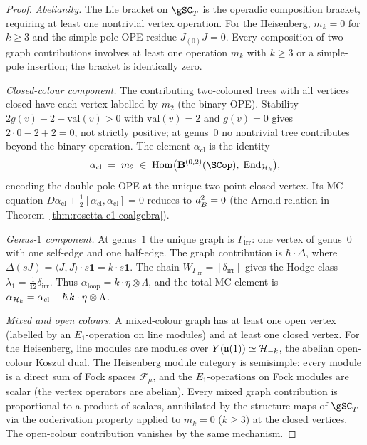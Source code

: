 \begin{proof}
\emph{Abelianity.}\enspace
The Lie bracket on $\gSC_T$ is the operadic composition bracket, requiring at least one nontrivial vertex operation. For the Heisenberg, $m_k = 0$ for $k \ge 3$ and the simple-pole OPE residue $J_{(0)}J = 0$. Every composition of two graph contributions involves at least one operation $m_k$ with $k \ge 3$ or a simple-pole insertion; the bracket is identically zero.

\emph{Closed-colour component.}\enspace
The contributing two-coloured trees with all vertices closed have each vertex labelled by $m_2$ (the binary OPE). Stability $2g(v) - 2 + \mathrm{val}(v) > 0$ with $\mathrm{val}(v) = 2$ and $g(v) = 0$ gives $2 \cdot 0 - 2 + 2 = 0$, not strictly positive; at genus~$0$ no nontrivial tree contributes beyond the binary operation. The element $\alpha_{\mathrm{cl}}$ is the identity
\[
\alpha_{\mathrm{cl}}
\;=\;
m_2 \;\in\;
\Hom\bigl(\mathbf{B}^{(0,2)}(\SCop),\;
\End_{\cH_k}\bigr),
\]
encoding the double-pole OPE at the unique two-point closed vertex. Its MC equation $D\alpha_{\mathrm{cl}} + \tfrac{1}{2}[\alpha_{\mathrm{cl}}, \alpha_{\mathrm{cl}}] = 0$ reduces to $d_{\bar{B}}^2 = 0$ (the Arnold relation in Theorem~\ref{thm:rosetta-e1-coalgebra}).

\emph{Genus-$1$ component.}\enspace
At genus~$1$ the unique graph is $\Gamma_{\mathrm{irr}}$: one vertex of genus~$0$ with one self-edge and one half-edge. The graph contribution is $\hbar \cdot \Delta$, where $\Delta(sJ) = \langle J, J \rangle \cdot s\mathbf{1} = k \cdot s\mathbf{1}$. The chain $W_{\Gamma_{\mathrm{irr}}} = [\delta_{\mathrm{irr}}]$ gives the Hodge class $\lambda_1 = \tfrac{1}{12}\delta_{\mathrm{irr}}$. Thus $\alpha_{\mathrm{loop}} = k \cdot \eta \otimes \Lambda$, and the total MC element is $\alpha_{\mathcal{H}_k} = \alpha_{\mathrm{cl}} + \hbar\,k \cdot \eta \otimes \Lambda$.

\emph{Mixed and open colours.}\enspace
A mixed-colour graph has at least one open vertex (labelled by an $E_1$-operation on line modules) and at least one closed vertex. For the Heisenberg, line modules are modules over $Y(\mathfrak{u}(1)) \simeq \mathcal{H}_{-k}$, the abelian open-colour Koszul dual. The Heisenberg module category is semisimple: every module is a direct sum of Fock spaces $\mathcal{F}_\mu$, and the $E_1$-operations on Fock modules are scalar (the vertex operators are abelian). Every mixed graph contribution is proportional to a product of scalars, annihilated by the structure maps of $\gSC_T$ via the coderivation property applied to $m_k = 0$ ($k \ge 3$) at the closed vertices. The open-colour contribution vanishes by the same mechanism.
\end{proof}

